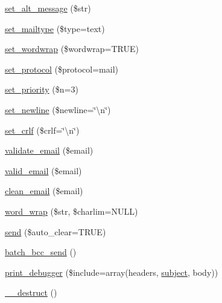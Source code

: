\begin{DoxyCompactItemize}
\item 
\mbox{\hyperlink{class_c_i___email_a18f0b650e6e9a859e1936a41e86fb3a6}{set\+\_\+alt\+\_\+message}} (\$str)
\item 
\mbox{\hyperlink{class_c_i___email_a9baeadff990ea673d75c3019c8cc3524}{set\+\_\+mailtype}} (\$type=\textquotesingle{}text\textquotesingle{})
\item 
\mbox{\hyperlink{class_c_i___email_a6abb8d5f17213eba1e243ca633da8084}{set\+\_\+wordwrap}} (\$wordwrap=T\+R\+UE)
\item 
\mbox{\hyperlink{class_c_i___email_a7be40507898a21ce9172b225e973b107}{set\+\_\+protocol}} (\$protocol=\textquotesingle{}mail\textquotesingle{})
\item 
\mbox{\hyperlink{class_c_i___email_aee3ae37c0bf5f8aca34f6e872efd66b8}{set\+\_\+priority}} (\$n=3)
\item 
\mbox{\hyperlink{class_c_i___email_a095be9606f6f063ee6e1af81b53d405e}{set\+\_\+newline}} (\$newline=\char`\"{}\textbackslash{}n\char`\"{})
\item 
\mbox{\hyperlink{class_c_i___email_a8bfdf8b14a9dcf4ee18b52c0a2afa833}{set\+\_\+crlf}} (\$crlf=\char`\"{}\textbackslash{}n\char`\"{})
\item 
\mbox{\hyperlink{class_c_i___email_a1907f0dba44e2968b8260dbc5770550f}{validate\+\_\+email}} (\$email)
\item 
\mbox{\hyperlink{class_c_i___email_abe07a23d74d453da8fb639b5c3951873}{valid\+\_\+email}} (\$email)
\item 
\mbox{\hyperlink{class_c_i___email_ab8139994bc1b1bee3d2750b627cdd0c6}{clean\+\_\+email}} (\$email)
\item 
\mbox{\hyperlink{class_c_i___email_aa3a2a5440115b320a0c2fcea542e546a}{word\+\_\+wrap}} (\$str, \$charlim=N\+U\+LL)
\item 
\mbox{\hyperlink{class_c_i___email_a547a65a81ba2d1f98cc15121a45dab11}{send}} (\$auto\+\_\+clear=T\+R\+UE)
\item 
\mbox{\hyperlink{class_c_i___email_a889f14cabfcfe05b5c0d0dbbb8f557e0}{batch\+\_\+bcc\+\_\+send}} ()
\item 
\mbox{\hyperlink{class_c_i___email_a11f22e40cb1409ee7569c0abc15fae09}{print\+\_\+debugger}} (\$include=array(\textquotesingle{}headers\textquotesingle{}, \textquotesingle{}\mbox{\hyperlink{class_c_i___email_aaa61b3aaa6cc4c90e26686e4bf41587a}{subject}}\textquotesingle{}, \textquotesingle{}body\textquotesingle{}))
\item 
\mbox{\hyperlink{class_c_i___email_a421831a265621325e1fdd19aace0c758}{\+\_\+\+\_\+destruct}} ()
\end{DoxyCompactItemize}
